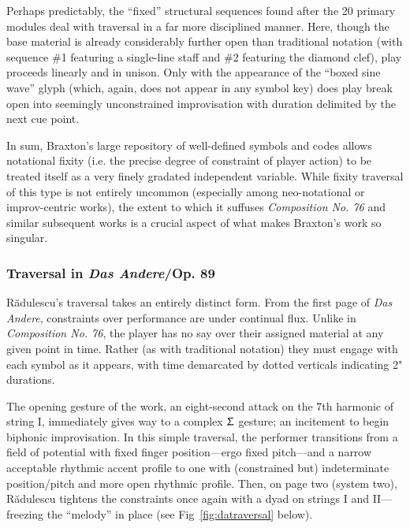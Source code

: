        Perhaps predictably, the ``fixed'' structural sequences found after the 20 primary modules deal with traversal in a far more disciplined manner. Here, though the base material is already considerably further open than traditional notation (with sequence \#1 featuring a single-line staff and \#2 featuring the diamond clef), play proceeds linearly and in unison. Only with the appearance of the ``boxed sine wave'' glyph (which, again, does not appear in any symbol key) does play break open into seemingly unconstrained improvisation with duration delimited by the next cue point.

        In sum, Braxton's large repository of well-defined symbols and codes allows notational fixity (i.e. the precise degree of constraint of player action) to be treated itself as a very finely gradated independent variable. While fixity traversal of this type is not entirely uncommon (especially among neo-notational or improv-centric works), the extent to which it suffuses \textit{Composition No. 76} and similar subsequent works is a crucial aspect of what makes Braxton's work so singular.

    \subsubsection{Traversal in \textit{Das Andere}/Op. 89}
    
        R\u{a}dulescu's traversal takes an entirely distinct form. From the first page of \textit{Das Andere}, constraints over performance are under continual flux. Unlike in \textit{Composition No. 76}, the player has no say over their assigned material at any given point in time. Rather (as with traditional notation) they must engage with each symbol as it appears, with time demarcated by dotted verticals indicating 2" durations.
        
        The opening gesture of the work, an eight-second attack on the 7th harmonic of string I, immediately gives way to a complex $\Upsigma$ gesture; an incitement to begin biphonic improvisation. In this simple traversal, the performer transitions from a field of potential with fixed finger position---ergo fixed pitch---and a narrow acceptable rhythmic accent profile to one with (constrained but) indeterminate position/pitch and more open rhythmic profile. Then, on page two (system two), R\u{a}dulescu tightens the constraints once again with a dyad on strings I and II---freezing the ``melody'' in place (see Fig~\ref{fig:datraversal} below).

